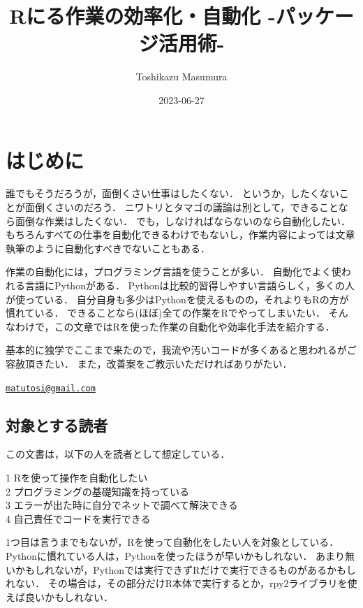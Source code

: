 \documentclass[
]{article}
\title{Rにる作業の効率化・自動化 -パッケージ活用術-}
\author{Toshikazu Masumura}
\date{2023-06-27}
\begin{document}
\maketitle

{
\setcounter{tocdepth}{2}
\tableofcontents
}
\hypertarget{ux306fux3058ux3081ux306b}{%
\section*{はじめに}\label{ux306fux3058ux3081ux306b}}

誰でもそうだろうが，面倒くさい仕事はしたくない．
というか，したくないことが面倒くさいのだろう．
ニワトリとタマゴの議論は別として，できることなら面倒な作業はしたくない．
でも，しなければならないのなら自動化したい．
もちろんすべての仕事を自動化できるわけでもないし，作業内容によっては文章執筆のように自動化すべきでないこともある．

作業の自動化には，プログラミング言語を使うことが多い．
自動化でよく使われる言語にPythonがある．
Pythonは比較的習得しやすい言語らしく，多くの人が使っている．
自分自身も多少はPythonを使えるものの，それよりもRの方が慣れている．
できることなら(ほぼ)全ての作業をRでやってしまいたい．
そんなわけで，この文章ではRを使った作業の自動化や効率化手法を紹介する．

基本的に独学でここまで来たので，我流や汚いコードが多くあると思われるがご容赦頂きたい．
また，改善案をご教示いただければありがたい．

\href{mailto:matutosi@gmail.com}{\nolinkurl{matutosi@gmail.com}}

\hypertarget{ux5bfeux8c61ux3068ux3059ux308bux8aadux8005}{%
\subsection{対象とする読者}\label{ux5bfeux8c61ux3068ux3059ux308bux8aadux8005}}

この文書は，以下の人を読者として想定している．

1 Rを使って操作を自動化したい\\
2 プログラミングの基礎知識を持っている\\
3 エラーが出た時に自分でネットで調べて解決できる\\
4 自己責任でコードを実行できる

1つ目は言うまでもないが，Rを使って自動化をしたい人を対象としている．
Pythonに慣れている人は，Pythonを使ったほうが早いかもしれない．
あまり無いかもしれないが，Pythonでは実行できずRだけで実行できるものがあるかもしれない．
その場合は，その部分だけR本体で実行するとか，rpy2ライブラリを使えば良いかもしれない．
\end{document}
